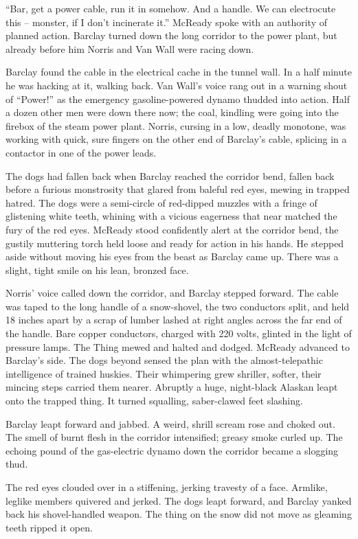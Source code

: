 \documentclass[letterpaper,openany,12pt]{memoir}		%
\begin{document}
``Bar, get a power cable, run it in somehow. And a handle. We can electrocute
this -- monster, if I don't incinerate it.'' McReady spoke with an authority of
planned action. Barclay turned down the long corridor to the power plant, but
already before him Norris and Van Wall were racing down.

Barclay found the cable in the electrical cache in the tunnel wall. In a half
minute he was hacking at it, walking back. Van Wall's voice rang out in a
warning shout of ``Power!'' as the emergency gasoline-powered dynamo thudded
into action. Half a dozen other men were down there now; the coal, kindling were
going into the firebox of the steam power plant. Norris, cursing in a low,
deadly monotone, was working with quick, sure fingers on the other end of
Barclay's cable, splicing in a contactor in one of the power leads.

The dogs had fallen back when Barclay reached the corridor bend, fallen back
before a furious monstrosity that glared from baleful red eyes, mewing in
trapped hatred. The dogs were a semi-circle of red-dipped muzzles with a fringe
of glistening white teeth, whining with a vicious eagerness that near matched
the fury of the red eyes. McReady stood confidently alert at the corridor bend,
the gustily muttering torch held loose and ready for action in his hands. He
stepped aside without moving his eyes from the beast as Barclay came up. There
was a slight, tight smile on his lean, bronzed face.

Norris' voice called down the corridor, and Barclay stepped forward. The cable
was taped to the long handle of a snow-shovel, the two conductors split, and
held 18 inches apart by a scrap of lumber lashed at right angles across the far
end of the handle. Bare copper conductors, charged with 220 volts, glinted in
the light of pressure lamps. The Thing mewed and halted and dodged. McReady
advanced to Barclay's side. The dogs beyond sensed the plan with the
almost-telepathic intelligence of trained huskies. Their whimpering grew
shriller, softer, their mincing steps carried them nearer. Abruptly a huge,
night-black Alaskan leapt onto the trapped thing. It turned squalling,
saber-clawed feet slashing.

Barclay leapt forward and jabbed. A weird, shrill scream rose and choked out.
The smell of burnt flesh in the corridor intensified; greasy smoke curled up.
The echoing pound of the gas-electric dynamo down the corridor became a slogging
thud.

The red eyes clouded over in a stiffening, jerking travesty of a face. Armlike,
leglike members quivered and jerked. The dogs leapt forward, and Barclay yanked
back his shovel-handled weapon. The thing on the snow did not move as gleaming
teeth ripped it open.
\end{document}
